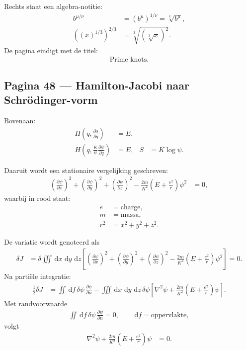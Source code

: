 \documentclass[11pt]{article}
\newcommand{\dd}{\,\mathrm{d}}
\newcommand{\pd}[2]{\frac{\partial #1}{\partial #2}}
\begin{document}
Rechts staat een algebra-notitie:
\begin{align*}
b^{\mu/\nu}
  &= \left(b^\mu\right)^{1/\nu}
   = \sqrt[\nu]{b^\mu},\\
\left((x)^{1/3}\right)^{2/3}
  &= \sqrt[3]{\left(\sqrt[3]{x}\right)^2}.
\end{align*}
De pagina eindigt met de titel:
\begin{align*}
\text{Prime knots}.
\end{align*}

\subsection*{Pagina 48 --- Hamilton-Jacobi naar Schrödinger-vorm}

Bovenaan:
\begin{align*}
H\left(q,\pd{s}{q}\right)&=E,\\
H\left(q,\frac{K}{\psi}\pd{\psi}{q}\right)&=E,
&
S&=K\log\psi.
\end{align*}

Daaruit wordt een stationaire vergelijking geschreven:
\begin{align*}
\left(\pd{\psi}{x}\right)^2
+\left(\pd{\psi}{y}\right)^2
+\left(\pd{\psi}{z}\right)^2
-\frac{2m}{K^2}
\left(E+\frac{e^2}{r}\right)\psi^2
&=0,
\end{align*}
waarbij in rood staat:
\begin{align*}
e&=\text{charge},\\
m&=\text{massa},\\
r^2&=x^2+y^2+z^2.
\end{align*}

De variatie wordt genoteerd als
\begin{align*}
\delta J
&=
\delta
\iiint \dd x\,\dd y\,\dd z
\left[
\left(\pd{\psi}{x}\right)^2
+\left(\pd{\psi}{y}\right)^2
+\left(\pd{\psi}{z}\right)^2
-\frac{2m}{K^2}\left(E+\frac{e^2}{r}\right)\psi^2
\right]
=0.
\end{align*}
Na partiële integratie:
\begin{align*}
\frac{1}{2}\delta J
&=
\iint \dd f\,\delta\psi\,\pd{\psi}{n}
-
\iiint \dd x\,\dd y\,\dd z\,
\delta\psi
\left[
\nabla^2\psi
+\frac{2m}{K^2}\left(E+\frac{e^2}{r}\right)\psi
\right].
\end{align*}
Met randvoorwaarde
\begin{align*}
\iint \dd f\,\delta\psi\,\pd{\psi}{n}=0,
\qquad
\dd f=\text{oppervlakte},
\end{align*}
volgt
\begin{align*}
\nabla^2\psi
+\frac{2m}{K^2}\left(E+\frac{e^2}{r}\right)\psi
&=0.
\end{align*}
\end{document}
